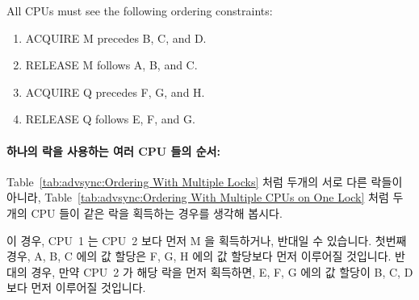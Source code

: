 \begin{enumerate}
{	All CPUs must see the following ordering constraints:
	\begin{enumerate}
	\item	ACQUIRE M precedes B, C, and D.
	\item	RELEASE M follows A, B, and C.
	\item	ACQUIRE Q precedes F, G, and H.
	\item	RELEASE Q follows E, F, and G.
	\end{enumerate}
	\fi
} \QuickQuizEnd

\paragraph{하나의 락을 사용하는 여러 CPU 들의 순서:}
Table~\ref{tab:advsync:Ordering With Multiple Locks} 처럼 두개의 서로 다른
락들이 아니라, Table~\ref{tab:advsync:Ordering With Multiple CPUs on One Lock}
처럼 두개의 CPU 들이 같은 락을 획득하는 경우를 생각해 봅시다.

\begin{table}[htbp]
\scriptsize{}
\caption{Ordering With Multiple CPUs on One Lock}
\label{tab:advsync:Ordering With Multiple CPUs on One Lock}
\end{table}

이 경우, CPU~1 는 CPU~2 보다 먼저 M 을 획득하거나, 반대일 수 있습니다.
첫번째 경우, A, B, C 에의 값 할당은 F, G, H 에의 값 할당보다 먼저 이루어질
것입니다.
반대의 경우, 만약 CPU~2 가 해당 락을 먼저 획득하면, E, F, G 에의 값 할당이 B,
C, D 보다 먼저 이루어질 것입니다.
\iffalse


\end{enumerate}

